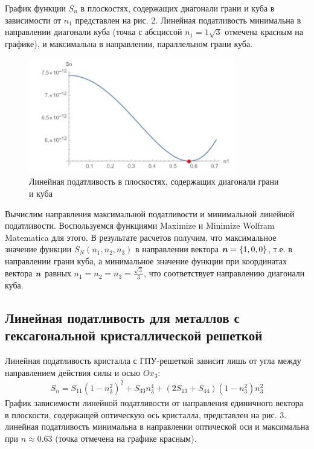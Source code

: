 \documentclass[12pt, a4paper]{article}
\renewcommand{\vec}[1]{\text{\mathversion{bold}${#1}$}}%
\begin{document}
График функции $S_n$ в плоскостях, содержащих диагонали грани и куба в зависимости от $n_1$ представлен на рис. 2. Линейная податливость минимальна в направлении диагонали куба (точка с абсциссой $n_1 = 1\sqrt{3}$ отмечена красным на графике), и
максимальна в направлении, параллельном грани куба.
\begin{figure}[!htbp]
	\centering
	\includegraphics[width=0.8\textwidth]{pic-2}%
	\caption{Линейная податливость в плоскостях, содержащих диагонали грани и куба}
	\vspace*{-2mm}
	\label{lin-grani-kuba}
\end{figure}

Вычислим направления максимальной податливости и минимальной линейной податливости. Воспользуемся функциями Maximize и Minimize Wolfram Matematica для этого. В результате расчетов получим, что максимальное значение функции $S_N(n_1, n_2, n_3)$ в направлении вектора $\vec{n} = \{1, 0, 0\}$, т.е. в направлении грани куба, а минимальное значение функции при координатах вектора $\vec{n}$ равных $n_1 = n_2 = n_3 = \frac{\sqrt{3}}{3}$, что соответствует направлению диагонали куба.

\subsection{Линейная податливость для металлов с гексагональной кристаллической решеткой}
Линейная податливость кристалла с ГПУ-решеткой зависит лишь от угла между
направлением действия силы и осью $Ox_3:$
\begin{gather}
	\label{lin-geks-form}
S_n = S_{11} \left(1 - n_3^2\right)^2 + S_{33} n_3^4
 + (2 S_{13} + S_{44}) (1 - n^2_3)n^2_3
\end{gather}
График зависимости линейной податливости от направления единичного вектора
в плоскости, содержащей оптическую ось кристалла, представлен на рис. 3. линейная податливость минимальна в направлении оптической оси и максимальна при
$n \approx 0.63$ (точка отмечена на графике красным).
\end{document}
